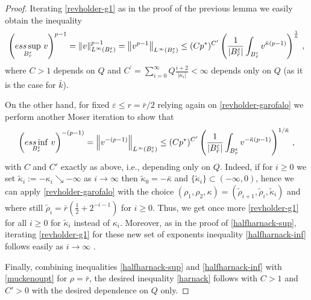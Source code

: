 \documentclass[10pt]{amsart}
\numberwithin{equation}{section}
\theoremstyle{definition}
\begin{document}
\begin{proof}
Iterating \eqref{revholder-g1} as in the proof of the previous lemma we easily obtain the inequality 
 \begin{equation}
\label{halfharnack-sup} 
\left(\underset{B^\varepsilon_{r}}{\rm{ess} \sup} \,\,v  \right)^{p-1}= \| v \|^{p-1}_{L^\infty(B^\varepsilon_{r})} =      \left\| v^{p-1} \right\|_{L^\infty(B^\varepsilon_{r})} \leq (C p^*)^{C^\prime}  \left( \frac{1}{|B_{ \bar{r}}^\varepsilon|}  \int_{ B_{\bar{r}}^\varepsilon} v^{\bar{\kappa} (p-1)}  \right)^{\frac{1}{\bar{\kappa}}}\, , 
\end{equation}
where $C>1$ depends on $Q$ and $C^\prime=\sum_{i=0}^\infty Q \frac{i+2}{|\kappa_i|}<\infty$ depends only on $Q$ (as it is the case for $\bar{k}$). 

On the other hand, for fixed $\varepsilon \leq r= \bar{r}/2$ relying again on \eqref{revholder-garofalo} we perform another Moser iteration to show that 
\begin{equation}
\label{halfharnack-inf}
 \left( \underset{B^\varepsilon_{r}}{\rm{ess} \inf} \,\,v \right)^{-(p-1)}=\left\| v^{-(p-1)} \right\|_{L^\infty (B^\varepsilon_{r})} \leq (C p^*)^{C^\prime}  \left( \frac{1}{|B^\varepsilon_{\bar{r}}|} \int_{B^\varepsilon_{\bar{r}}} v^{-\bar{\kappa}(p-1)}\right)^{1/\bar{\kappa}} \, ,
\end{equation}
with $C$ and $C'$ exactly as above, i.e., depending  only on $Q$.
Indeed, if for $i \geq 0$ we set $\tilde{\kappa}_i:=- \kappa_i \searrow -\infty $ as $i \to \infty$ then $\tilde{\kappa}_0=-\bar{\kappa}$ and $\{\tilde{\kappa}_i\} \subset (-\infty, 0)$, hence we can apply \eqref{revholder-garofalo} with the choice $(\rho_1,\rho_2,\kappa)=(\tilde{\rho}_{i+1}, \tilde{\rho}_i,\tilde{\kappa}_i)$ and where still $\tilde{\rho}_i=\bar{r}(\frac12+2^{-i-1})$ for $i \geq 0$. Thus, we get once more \eqref{revholder-g1} for all $i \geq 0$ for $\tilde{\kappa}_i$ instead of $\kappa_i$. Moreover, as in the proof of \eqref{halfharnack-sup}, iterating \eqref{revholder-g1} for these new set of exponents inequality \eqref{halfharnack-inf} follows  easily as $i \to \infty$ . 

Finally, combining inequalities \eqref{halfharnack-sup} and \eqref{halfharnack-inf} with \eqref{muckenoupt} for $\rho=\bar{r}$, the desired inequality \eqref{harnack} follows with $C>1$ and $C'>0$ with the desired dependence on $Q$ only.	




\end{proof}
\end{document}
